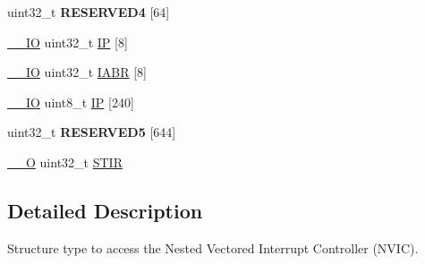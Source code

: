 \begin{DoxyCompactItemize}
\item 
\hypertarget{struct_n_v_i_c___type_aaed8c9afc755176cd51954c3056cc446}{uint32\-\_\-t {\bfseries R\-E\-S\-E\-R\-V\-E\-D4} \mbox{[}64\mbox{]}}\label{struct_n_v_i_c___type_aaed8c9afc755176cd51954c3056cc446}

\item 
\hyperlink{group___c_m_s_i_s__core__definitions_gaec43007d9998a0a0e01faede4133d6be}{\-\_\-\-\_\-\-I\-O} uint32\-\_\-t \hyperlink{struct_n_v_i_c___type_a519d82311efa6ead6f53b495d3d80de8}{I\-P} \mbox{[}8\mbox{]}
\item 
\hyperlink{group___c_m_s_i_s__core__definitions_gaec43007d9998a0a0e01faede4133d6be}{\-\_\-\-\_\-\-I\-O} uint32\-\_\-t \hyperlink{struct_n_v_i_c___type_ab61000be19b0293ea14009224fc34fe3}{I\-A\-B\-R} \mbox{[}8\mbox{]}
\item 
\hyperlink{group___c_m_s_i_s__core__definitions_gaec43007d9998a0a0e01faede4133d6be}{\-\_\-\-\_\-\-I\-O} uint8\-\_\-t \hyperlink{struct_n_v_i_c___type_a38c377984f751265667317981f101bb4}{I\-P} \mbox{[}240\mbox{]}
\item 
\hypertarget{struct_n_v_i_c___type_a46aeb40348124934bf802f01806b4f7f}{uint32\-\_\-t {\bfseries R\-E\-S\-E\-R\-V\-E\-D5} \mbox{[}644\mbox{]}}\label{struct_n_v_i_c___type_a46aeb40348124934bf802f01806b4f7f}

\item 
\hyperlink{group___c_m_s_i_s__core__definitions_ga7e25d9380f9ef903923964322e71f2f6}{\-\_\-\-\_\-\-O} uint32\-\_\-t \hyperlink{struct_n_v_i_c___type_a471c399bb79454dcdfb342a31a5684ae}{S\-T\-I\-R}
\end{DoxyCompactItemize}


\subsection{Detailed Description}
Structure type to access the Nested Vectored Interrupt Controller (N\-V\-I\-C). 

